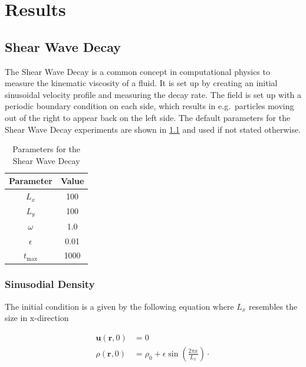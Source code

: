 \chapter{Results}


\section{Shear Wave Decay}
The Shear Wave Decay is a common concept in computational physics to measure the kinematic viscosity of a fluid.
It is set up by creating an initial sinusoidal velocity profile and measuring the decay rate.
The field is set up with a periodic boundary condition on each side, which results in e.g.\ particles moving out of the right to appear back on the left side.
The default parameters for the Shear Wave Decay experiments are shown in \cref{tab:swd-parameters} and used if not stated otherwise.

\begin{table}[ht]
    \centering %
    \begin{tabular}{c c}
        \hline\hline %
        Parameter  & Value \\ [0.5ex] %
        \hline %
        $L_x$      & 100   \\
        $L_y$      & 100   \\
        $\omega$   & 1.0   \\
        $\epsilon$ & 0.01  \\
        $t_{\max}$ & 1000  \\ [1ex] %
        \hline %
    \end{tabular}
    \caption{Parameters for the Shear Wave Decay} %
    \label{tab:swd-parameters}
\end{table}

\subsection{Sinusodial Density}
The initial condition is a given by the following equation where $L_x$ resembles the size in x-direction

\begin{equation*}
    \begin{aligned}
        \mathbf{u}(\mathbf{r},0) &= 0 \\
        \rho(\mathbf{r},0) &= \rho_0 + \epsilon \sin \left( \frac{2 \pi x}{L_x} \right) \cdot
    \end{aligned}
\end{equation*}

